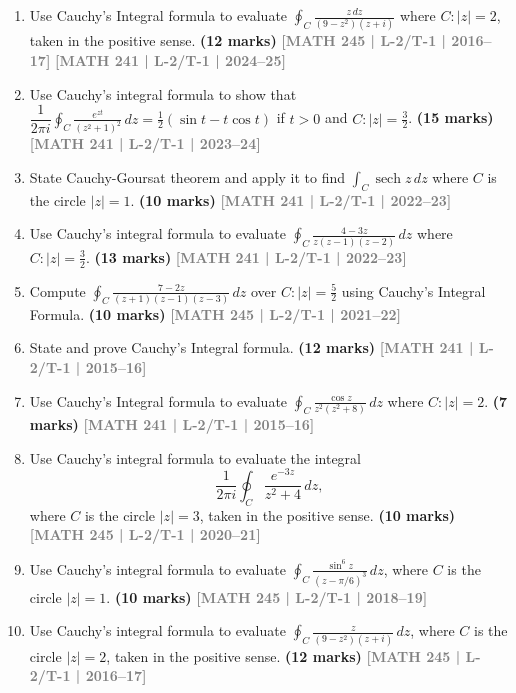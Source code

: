 \documentclass[12pt,a3paper]{article}
\newcommand{\yr}[1]{\hfill\textcolor{gray}{\small\textbf{[#1]}}}
\newcommand{\mk}[1]{\textcolor{orange!70!black}{\small\textbf{(#1 marks)}}}
\begin{document}
\begin{enumerate}


\item Use Cauchy's Integral formula to evaluate $\displaystyle\oint_{C}\frac{z\,dz}{(9-z^{2})(z+i)}$ where $C\colon|z|=2$, taken in the positive sense.
\mk{12} \yr{MATH 245 | L-2/T-1 | 2016--17} \yr{MATH 241 | L-2/T-1 | 2024--25}


\item Use Cauchy's integral formula to show that $\dfrac{1}{2\pi i}\displaystyle\oint_{C}\frac{e^{zt}}{(z^{2}+1)^{2}}\,dz=\tfrac{1}{2}(\sin t - t\cos t)$ if $t>0$ and $C\colon|z|=\tfrac{3}{2}$.
\mk{15} \yr{MATH 241 | L-2/T-1 | 2023--24}


\item State Cauchy-Goursat theorem and apply it to find $\displaystyle\int_{C}\operatorname{sech}z\,dz$ where $C$ is the circle $|z|=1$.
\mk{10} \yr{MATH 241 | L-2/T-1 | 2022--23}


\item Use Cauchy's integral formula to evaluate $\displaystyle\oint_{C}\frac{4-3z}{z(z-1)(z-2)}\,dz$ where $C\colon|z|=\tfrac{3}{2}$.
\mk{13} \yr{MATH 241 | L-2/T-1 | 2022--23}


\item Compute $\displaystyle\oint_{C}\frac{7-2z}{(z+1)(z-1)(z-3)}\,dz$ over $C\colon|z|=\tfrac{5}{2}$ using Cauchy's Integral Formula.
\mk{10} \yr{MATH 245 | L-2/T-1 | 2021--22}


\item State and prove Cauchy's Integral formula.
\mk{12} \yr{MATH 241 | L-2/T-1 | 2015--16}


\item Use Cauchy's Integral formula to evaluate $\displaystyle\oint_{C}\frac{\cos z}{z^{2}(z^{2}+8)}\,dz$ where $C\colon|z|=2$.
\mk{7} \yr{MATH 241 | L-2/T-1 | 2015--16}
  
  
  \item Use Cauchy's integral formula to evaluate the integral
\[
\frac{1}{2\pi i}\oint_{C} \frac{e^{-3z}}{z^{2}+4}\,dz,
\]
where $C$ is the circle $|z|=3$, taken in the positive sense.
\mk{10} \yr{MATH 245 | L-2/T-1 | 2020--21}


\item Use Cauchy's integral formula to evaluate $\displaystyle\oint_{C}\frac{\sin^{6}z}{(z-\pi/6)^{3}}\,dz$, where $C$ is the circle $|z|=1$.
\mk{10} \yr{MATH 245 | L-2/T-1 | 2018--19}


\item Use Cauchy's integral formula to evaluate $\displaystyle\oint_{C}\frac{z}{(9-z^{2})(z+i)}\,dz$, where $C$ is the circle $|z|=2$, taken in the positive sense.
\mk{12} \yr{MATH 245 | L-2/T-1 | 2016--17}



\end{enumerate}
\end{document}
